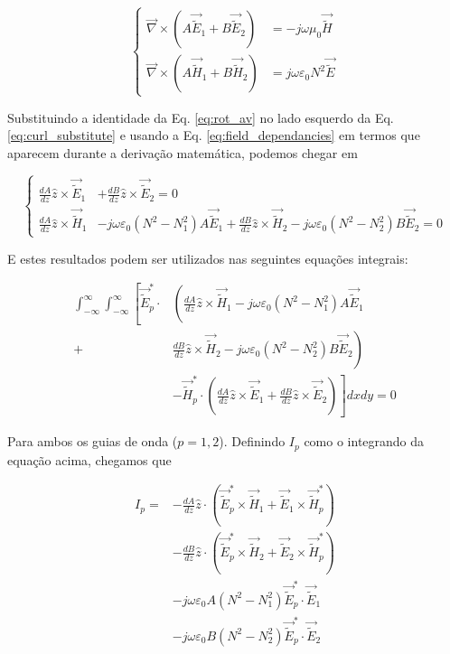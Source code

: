\documentclass[11pt]{article} %
\newcommand{\diverg}{\vec{\nabla}}
\newcommand{\tildee}{ \vec{\tilde{E}}}
\newcommand{\tildeh}{ \vec{\tilde{H}}}
\newcommand{\epsz}{\varepsilon_0}
\newcommand{\muz}{\mu_0}
\begin{document}
\begin{equation}\label{eq:curl_substitute}
\left\{
\begin{split}
\diverg\times \left( A\tildee_1 + B\tildee_2 \right) &= -j\omega\muz\tildeh \\
\diverg\times \left( A\tildeh_1 + B\tildeh_2 \right) &= j\omega\epsz N^2\tildee
\end{split}
\right.
\end{equation}

Substituindo a identidade da Eq. \ref{eq:rot_av} no lado esquerdo da Eq. \ref{eq:curl_substitute} e usando a Eq. \ref{eq:field_dependancies} em termos que aparecem durante a derivação matemática, podemos chegar em

\begin{equation}\label{eq:AB_dependancies}
\left\{
\begin{split}
\frac{dA}{dz}\hat{z}\times\tildee_1 &+ \frac{dB}{dz}\hat{z}\times\tildee_2 = 0 \\
\frac{dA}{dz}\hat{z}\times\tildeh_1 &-j\omega\epsz\left(N^2-N_1^2\right)A\tildee_1 + \frac{dB}{dz}\hat{z}\times\tildeh_2 -j\omega\epsz\left(N^2-N_2^2\right)B\tildee_2 = 0
\end{split}\right.
\end{equation}

E estes resultados podem ser utilizados nas seguintes equações integrais:

\begin{equation}\label{eq:integral_equations}
\begin{split}
 \int_{-\infty}^\infty \int_{-\infty}^\infty \left[ \tildee_p^*\cdot\right.&\left(\frac{dA}{dz}\hat{z}\times\tildeh_1 - j\omega\epsz\left(N^2-N_1^2\right)A\tildee_1 \right. \\
+ &\left. \frac{dB}{dz}\hat{z}\times\tildeh_2 -j\omega\epsz\left(N^2-N_2^2\right)B\tildee_2\right) \\
 &\left. - \tildeh_p^*\cdot\left( \frac{dA}{dz}\hat{z}\times\tildee_1 + \frac{dB}{dz}\hat{z}\times\tildee_2\right) \right] dxdy = 0
\end{split}
\end{equation}

Para ambos os guias de onda ($p=1,2$). Definindo $I_p$ como o integrando da equação acima, chegamos que

\begin{equation}\label{eq:I_p}
\begin{split}
I_p = &- \frac{dA}{dz}\hat{z}\cdot\left( \tildee_p^*\times\tildeh_1 + \tildee_1\times\tildeh_p^*\right) \\
& - \frac{dB}{dz}\hat{z}\cdot\left( \tildee_p^*\times\tildeh_2 + \tildee_2\times\tildeh_p^*\right) \\
& - j\omega\epsz A\left(N^2-N_1^2\right)\tildee_p^*\cdot\tildee_1 \\
& - j\omega\epsz B\left(N^2-N_2^2\right)\tildee_p^*\cdot\tildee_2
\end{split}
\end{equation}
\end{document}

